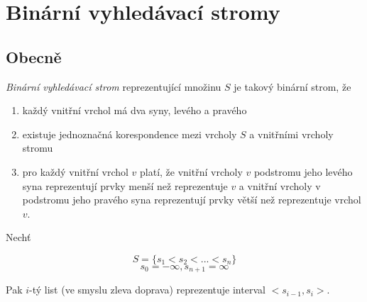 

\chapter{Binární vyhledávací stromy}
\label{bvs}


\section{Obecně}
\label{bvs:obecne}

\begin{defn}
\emph{Binární vyhledávací strom} reprezentující množinu $S$ je takový 
binární strom, že 

\begin{enumerate}
\item každý vnitřní vrchol má dva syny, levého a pravého
\item existuje jednoznačná korespondence mezi vrcholy $S$ a vnitřními 
vrcholy stromu
\item pro každý vnitřní vrchol $v$ platí, že vnitřní vrcholy $v$ podstromu 
jeho levého syna reprezentují prvky menší než reprezentuje $v$ a vnitřní 
vrcholy v podstromu jeho pravého syna reprezentují prvky větší než 
reprezentuje vrchol $v$.
\end{enumerate}
\end{defn}

\begin{pozn}
Nechť

$$
S = \{ s_1 < s_2 < ... < s_n \}
$$
$$
s_0 = - \infty, s_{n+1} = \infty
$$

Pak $i$-tý list (ve smyslu zleva doprava) reprezentuje interval 
$<s_{i-1}, s_i>$.
\end{pozn}

